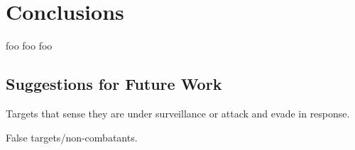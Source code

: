 \chapter{Conclusions}
foo foo foo

\section{Suggestions for Future Work}
Targets that sense they are under surveillance or attack and evade in response.

False targets/non-combatants.
